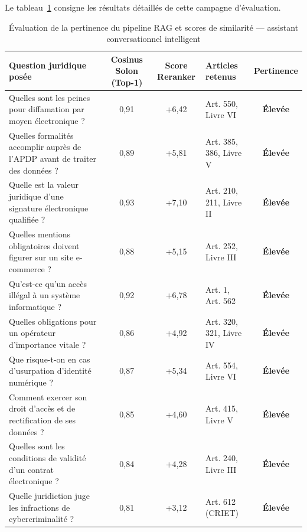 Le tableau~\ref{tab:rag_cosinus} consigne les résultats détaillés de cette campagne d'évaluation.

\begin{table}[H]
\centering
\caption{Évaluation de la pertinence du pipeline RAG et scores de similarité — assistant conversationnel intelligent}
\label{tab:rag_cosinus}
\renewcommand{\arraystretch}{1.3}
\small
\begin{tabular}{|p{5.2cm}|c|c|p{2.8cm}|c|}
\hline
\textbf{Question juridique posée} & \textbf{Cosinus Solon (Top-1)} & \textbf{Score Reranker} & \textbf{Articles retenus} & \textbf{Pertinence} \\
\hline
Quelles sont les peines pour diffamation par moyen électronique ? & 0,91 & +6,42 & Art. 550, Livre VI & \textcolor{green!60!black}{\textbf{Élevée}} \\
\hline
Quelles formalités accomplir auprès de l'APDP avant de traiter des données ? & 0,89 & +5,81 & Art. 385, 386, Livre V & \textcolor{green!60!black}{\textbf{Élevée}} \\
\hline
Quelle est la valeur juridique d'une signature électronique qualifiée ? & 0,93 & +7,10 & Art. 210, 211, Livre II & \textcolor{green!60!black}{\textbf{Élevée}} \\
\hline
Quelles mentions obligatoires doivent figurer sur un site e-commerce ? & 0,88 & +5,15 & Art. 252, Livre III & \textcolor{green!60!black}{\textbf{Élevée}} \\
\hline
Qu'est-ce qu'un accès illégal à un système informatique ? & 0,92 & +6,78 & Art. 1, Art. 562 & \textcolor{green!60!black}{\textbf{Élevée}} \\
\hline
Quelles obligations pour un opérateur d'importance vitale ? & 0,86 & +4,92 & Art. 320, 321, Livre IV & \textcolor{green!60!black}{\textbf{Élevée}} \\
\hline
Que risque-t-on en cas d'usurpation d'identité numérique ? & 0,87 & +5,34 & Art. 554, Livre VI & \textcolor{green!60!black}{\textbf{Élevée}} \\
\hline
Comment exercer son droit d'accès et de rectification de ses données ? & 0,85 & +4,60 & Art. 415, Livre V & \textcolor{green!60!black}{\textbf{Élevée}} \\
\hline
Quelles sont les conditions de validité d'un contrat électronique ? & 0,84 & +4,28 & Art. 240, Livre III & \textcolor{green!60!black}{\textbf{Élevée}} \\
\hline
Quelle juridiction juge les infractions de cybercriminalité ? & 0,81 & +3,12 & Art. 612 (CRIET) & \textcolor{green!60!black}{\textbf{Élevée}} \\
\hline
\end{tabular}
\end{table}

